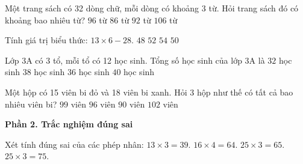 \begin{ex} %
Một trang sách có 32 dòng chữ, mỗi dòng có khoảng 3 từ. Hỏi trang sách đó có khoảng bao nhiêu từ?
\choice
{\True $96$ từ}
{$86$ từ}
{$92$ từ}
{$106$ từ}
\end{ex}

\begin{ex} %
Tính giá trị biểu thức: $13 \times 6 - 28$.
\choice
{$48$}
{$52$}
{$54$}
{\True $50$}
\end{ex}

\begin{ex} %
Lớp 3A có 3 tổ, mỗi tổ có 12 học sinh. Tổng số học sinh của lớp 3A là
\choice
{$32$ học sinh}
{$38$ học sinh}
{\True $36$ học sinh}
{$40$ học sinh}
\end{ex}

\begin{ex} %
Một hộp có 15 viên bi đỏ và 18 viên bi xanh. Hỏi 3 hộp như thế có tất cả bao nhiêu viên bi?
\choice
{\True $99$ viên}
{$96$ viên}
{$90$ viên}
{$102$ viên}
\end{ex}

\textbf{Phần 2. Trắc nghiệm đúng sai}

\begin{ex} %
Xét tính đúng sai của các phép nhân:
\choiceTF
{\True $13 \times 3 = 39$.}
{\True $16 \times 4 = 64$.}
{$25 \times 3 = 65$.}
{\True $25 \times 3 = 75$.}
\end{ex}

